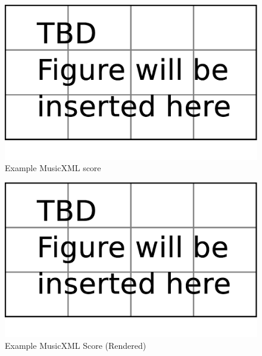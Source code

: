 
\begin{figure}[tp]
   \begin{center}
      \includegraphics[width=\textwidth]{fig/TBDFigure}

   \end{center}
   \caption{Example MusicXML score}
   \label{fig:expxml}
\end{figure}

\begin{figure}[tp]
   \begin{center}
      \includegraphics[width=\textwidth]{fig/TBDFigure}

   \end{center}
   \caption{Example MusicXML Score (Rendered)}
   \label{fig:expxmlrend}
\end{figure}

